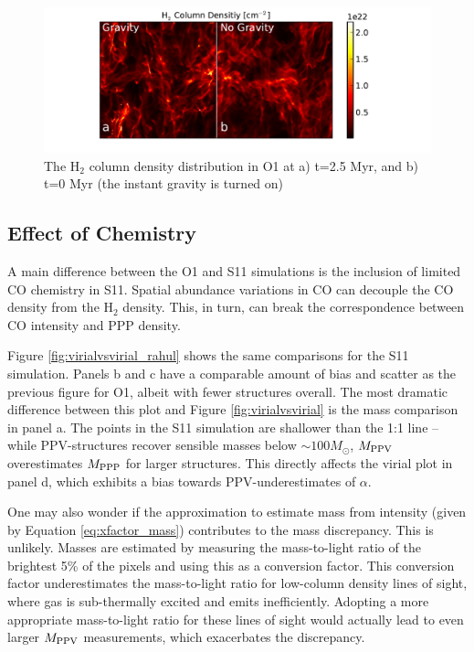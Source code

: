 \begin{figure}[htbp]
\includegraphics[width=6in]{figures/stella_moment}
\caption{The H$_2$ column density distribution in O1 at a) t=2.5 Myr, and b) t=0 Myr (the instant gravity is turned on)}
\label{fig:stella_moments}
\end{figure}


\subsection{Effect of Chemistry}
A main difference between the O1 and S11 simulations is the inclusion of limited CO chemistry in S11. Spatial abundance variations in CO can decouple the CO density from the H$_2$ density. This, in turn, can break the correspondence between CO intensity and PPP density.

Figure \ref{fig:virialvsvirial_rahul} shows the same comparisons for the S11 simulation. Panels b and c have a comparable amount of bias and scatter as the previous figure for O1, albeit with fewer structures overall. The most dramatic difference between this plot and Figure \ref{fig:virialvsvirial} is the mass comparison in panel a. The points in the S11 simulation are shallower than the 1:1 line -- while PPV-structures recover sensible masses below $\sim 100 M_\odot$, $M_{\rm PPV}$ overestimates $M_{\rm PPP}$ for larger structures. This directly affects the virial plot in panel d, which exhibits a bias towards PPV-underestimates of $\alpha$.

One may also wonder if the approximation to estimate mass from intensity (given by Equation \ref{eq:xfactor_mass}) contributes to the mass discrepancy. This is unlikely. Masses are estimated by measuring the mass-to-light ratio of the brightest 5\% of the pixels and using this as a conversion factor. This conversion factor underestimates the mass-to-light ratio for low-column density lines of sight, where gas is sub-thermally excited and emits inefficiently. Adopting a more appropriate mass-to-light ratio for these lines of sight would actually lead to even larger $M_{\rm PPV}$ measurements, which exacerbates the discrepancy.

